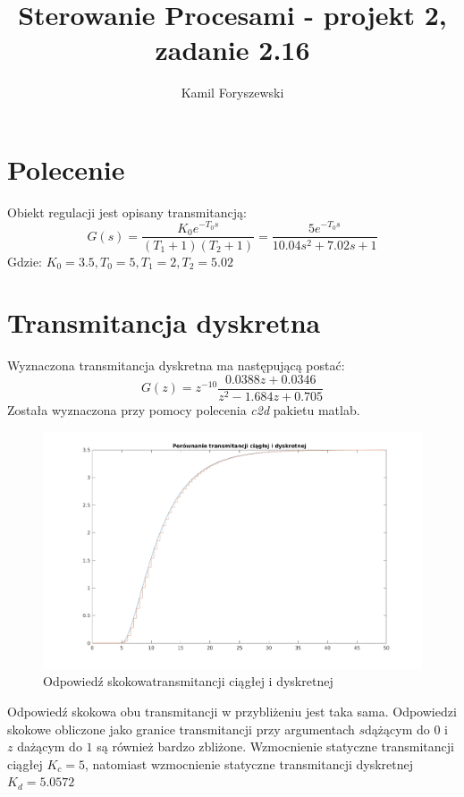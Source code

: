 \documentclass[a4paper, 11pt]{article}
\author{Kamil Foryszewski}
\title{Sterowanie Procesami - projekt 2, zadanie 2.16}
\begin{document}

\maketitle
\tableofcontents

\section{Polecenie}
Obiekt regulacji jest opisany transmitancją: 
$$G(s) = \frac{K_0e^{-T_0s}}{(T_1 + 1)(T_2+1)}  = \frac{5e^{-T_0s}}{10.04s^2+7.02s +1}  $$
Gdzie: 
$K_0 = 3.5, T_0 = 5, T_1 = 2, T_2 = 5.02$

\section{Transmitancja dyskretna}
Wyznaczona transmitancja dyskretna ma następującą postać: 
$$G(z) = z^{-10}\frac{0.0388z+0.0346}{z^2-1.684z+0.705}$$
Została wyznaczona przy pomocy polecenia \emph{c2d} pakietu matlab. 
\begin{figure}[htp]
\centering
\includegraphics[scale=0.6]{1_1.png}
\caption{Odpowiedź skokowatransmitancji ciągłej i dyskretnej}
\label{}
\end{figure}%
Odpowiedź skokowa obu transmitancji w przybliżeniu jest taka sama. Odpowiedzi skokowe obliczone jako granice transmitancji przy argumentach $s$dążącym do $0$ i $z$ dażącym do $1$ są również bardzo zbliżone. Wzmocnienie statyczne transmitancji ciągłej $K_c = 5$, natomiast wzmocnienie statyczne transmitancji dyskretnej $K_d = 5.0572$
\end{document}
